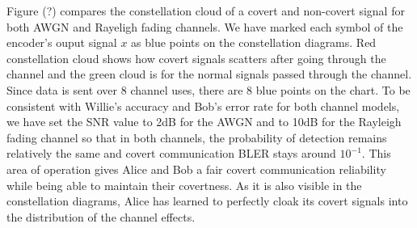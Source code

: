 Figure (?) compares the constellation cloud of a covert and non-covert signal for both AWGN and Rayeligh fading channels. We have marked each symbol of the encoder's ouput signal \(x\) as blue points on the constellation diagrams. Red constellation cloud shows how covert signals scatters after going through the channel and the green cloud is for the normal signals passed through the channel. Since data is sent over 8 channel uses, there are 8 blue points on the chart. To be consistent with Willie's accuracy and Bob's error rate for both channel models, we have set the SNR value to 2dB for the AWGN and to 10dB for the Rayleigh fading channel so that in both channels, the probability of detection remains relatively the same and covert communication BLER stays around \(10^{-1}\). This area of operation gives Alice and Bob a fair covert communication reliability while being able to maintain their covertness. As it is also visible in the constellation diagrams, Alice has learned to perfectly cloak its covert signals into the distribution of the channel effects.